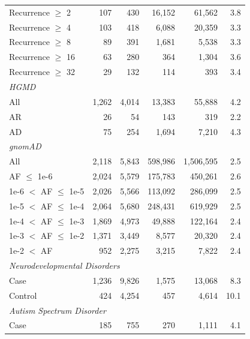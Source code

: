 \begin{tabular}{lrrrrr}
\quad Recurrence $\geq$ 2 & 107 & 430 & 16{,}152 & 61{,}562 & 3.8 \\
\quad Recurrence $\geq$ 4 & 103 & 418 & 6{,}088 & 20{,}359 & 3.3 \\
\quad Recurrence $\geq$ 8 & 89 & 391 & 1{,}681 & 5{,}538 & 3.3 \\
\quad Recurrence $\geq$ 16 & 63 & 280 & 364 & 1{,}304 & 3.6 \\
\quad Recurrence $\geq$ 32 & 29 & 132 & 114 & 393 & 3.4 \\
\hline
\multicolumn{6}{l}{\textit{HGMD}} \\
\quad All & 1{,}262 & 4{,}014 & 13{,}383 & 55{,}888 & 4.2 \\
\quad AR & 26 & 54 & 143 & 319 & 2.2 \\
\quad AD & 75 & 254 & 1{,}694 & 7{,}210 & 4.3 \\
\hline
\multicolumn{6}{l}{\textit{gnomAD}} \\
\quad All & 2{,}118 & 5{,}843 & 598{,}986 & 1{,}506{,}595 & 2.5 \\
\quad AF $\leq$ 1e-6 & 2{,}024 & 5{,}579 & 175{,}783 & 450{,}261 & 2.6 \\
\quad 1e-6 $<$ AF $\leq$ 1e-5 & 2{,}026 & 5{,}566 & 113{,}092 & 286{,}099 & 2.5 \\
\quad 1e-5 $<$ AF $\leq$ 1e-4 & 2{,}064 & 5{,}680 & 248{,}431 & 619{,}929 & 2.5 \\
\quad 1e-4 $<$ AF $\leq$ 1e-3 & 1{,}869 & 4{,}973 & 49{,}888 & 122{,}164 & 2.4 \\
\quad 1e-3 $<$ AF $\leq$ 1e-2 & 1{,}371 & 3{,}449 & 8{,}577 & 20{,}320 & 2.4 \\
\quad 1e-2 $<$ AF & 952 & 2{,}275 & 3{,}215 & 7{,}822 & 2.4 \\
\hline
\multicolumn{6}{l}{\textit{Neurodevelopmental Disorders}} \\
\quad Case & 1{,}236 & 9{,}826 & 1{,}575 & 13{,}068 & 8.3 \\
\quad Control & 424 & 4{,}254 & 457 & 4{,}614 & 10.1 \\
\hline
\multicolumn{6}{l}{\textit{Autism Spectrum Disorder}} \\
\quad Case & 185 & 755 & 270 & 1{,}111 & 4.1 \\
\hline
\end{tabular}
